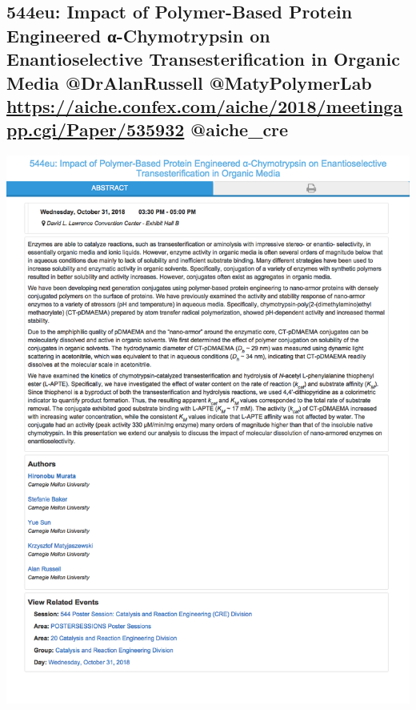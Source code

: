 \documentclass[11pt]{article}
\begin{document}
\subsection{544eu: Impact of Polymer-Based Protein Engineered α-Chymotrypsin on Enantioselective Transesterification in Organic Media @DrAlanRussell @MatyPolymerLab \url{https://aiche.confex.com/aiche/2018/meetingapp.cgi/Paper/535932} @aiche\_cre}
\label{sec:org04e7725}
\begin{center}
\includegraphics[width=.9\linewidth]{./535932.png}
\end{center}
\end{document}
